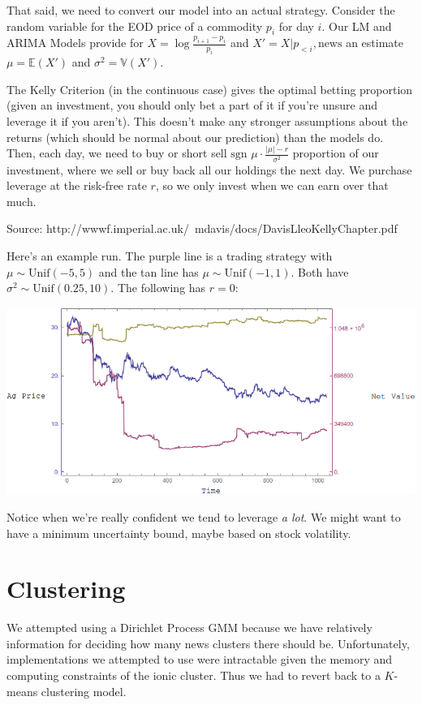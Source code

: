 \documentclass{article}
\begin{document}
That said, we need to convert our model into an actual strategy. Consider the random variable for the EOD price of a commodity $p_i$ for day $i$. Our LM and ARIMA Models provide for $X = \log\frac{p_{i+1}-p_i}{p_i}$ and $X'=X|p_{<i},\text{news}$ an estimate $\mu=\mathbb{E}(X')$ and $\sigma^2=\mathbb{V}(X')$.

The Kelly Criterion (in the continuous case) gives the optimal betting proportion (given an investment, you should only bet a part of it if you're unsure and leverage it if you aren't). This doesn't make any stronger assumptions about the returns (which should be normal about our prediction) than the models do. Then, each day, we need to buy or short sell $\text{sgn }\mu\cdot\frac{\left|\mu\right|-r}{\sigma^2}$ proportion of our investment, where we sell or buy back all our holdings the next day. We purchase leverage at the risk-free rate $r$, so we only invest when we can earn over that much.

Source: http://wwwf.imperial.ac.uk/~mdavis/docs/DavisLleoKellyChapter.pdf

Here's an example run. The purple line is a trading strategy with $\mu\sim\text{Unif}(-5,5)$ and the tan line has $\mu\sim\text{Unif}(-1,1)$. Both have $\sigma^2\sim\text{Unif}(0.25,10)$. The following has $r=0$:

\begin{center}
\includegraphics[scale=0.5]{../KellyRun-Random.png}
\end{center}

Notice when we're really confident we tend to leverage {\em a lot}. We might want to have a minimum uncertainty bound, maybe based on stock volatility.

		\section{Clustering}
	
	We attempted using a Dirichlet Process GMM because we have relatively information for deciding how many news clusters there should be. Unfortunately, implementations we attempted to use were intractable given the memory and computing constraints of the ionic cluster. Thus we had to revert back to a $K$-means clustering model.
\end{document}
